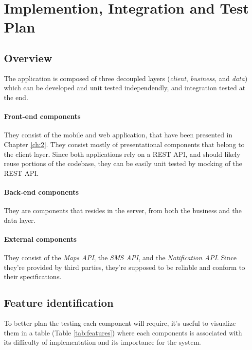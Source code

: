 
\section{Implemention, Integration and Test Plan}

\subsection{Overview}

The application is composed of three decoupled layers (\emph{client}, \emph{business}, and \emph{data}) which can be developed and unit tested independendly, and integration tested at the end.

\paragraph{Front-end components} They consist of the mobile and web application, that have been presented in Chapter \ref{ch:2}. They consist mostly of presentational components that belong to the client layer. Since both applications rely on a REST API, and should likely reuse portions of the codebase, they can be easily unit tested by mocking of the REST API.

\paragraph{Back-end components} They are components that resides in the server, from both the business and the data layer.

\paragraph{External components} They consist of the \emph{Maps API}, the \emph{SMS API}, and the \emph{Notification API}. Since they're provided by third parties, they're supposed to be reliable and conform to their specifications.

\subsection{Feature identification}

To better plan the testing each component will require, it's useful to visualize them in a table (Table \ref{tab:features}) where each components is associated with its difficulty of implementation and its importance for the system.

